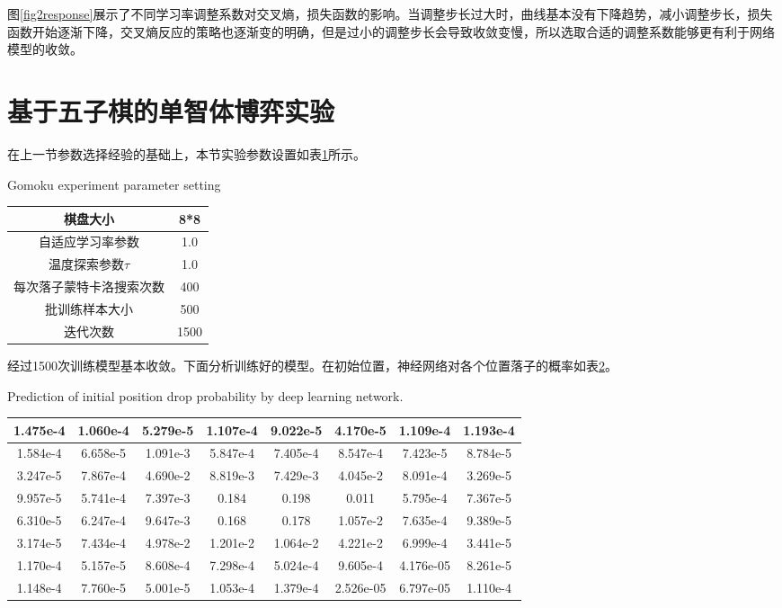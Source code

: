 图\ref{fig2response}展示了不同学习率调整系数对交叉熵，损失函数的影响。当调整步长过大时，曲线基本没有下降趋势，减小调整步长，损失函数开始逐渐下降，交叉熵反应的策略也逐渐变的明确，但是过小的调整步长会导致收敛变慢，所以选取合适的调整系数能够更有利于网络模型的收敛。
\section{基于五子棋的单智体博弈实验}

在上一节参数选择经验的基础上，本节实验参数设置如表\ref{canshu}所示。
\begin{table}[htbp]
	\centering
	{Gomoku experiment parameter setting}
	\label{canshu}
	\begin{tabular}{c|c}
		\hline 
		棋盘大小 & 8*8 \\ 
		\hline 
		自适应学习率参数 & 1.0 \\ 
		\hline 
		温度探索参数$\tau$& 1.0 \\ 
		\hline 
		每次落子蒙特卡洛搜索次数 & 400 \\ 
		\hline 
		批训练样本大小 & 500 \\ 
		\hline 
		迭代次数 & 1500 \\ 
		\hline 
	\end{tabular} 
\end{table}



经过1500次训练模型基本收敛。下面分析训练好的模型。在初始位置，神经网络对各个位置落子的概率如表\ref{tab:gailv}。
\begin{table}[htbp]
	\centering
	{Prediction of initial position drop probability by deep learning network.}
	\label{tab:gailv}
	\begin{tabular}{|c|c|c|c|c|c|c|c|}
		\hline 
		1.475e-4 & 1.060e-4 & 5.279e-5 & 1.107e-4 & 9.022e-5 & 4.170e-5 & 1.109e-4 & 1.193e-4 \\ 
		\hline 
		1.584e-4 & 6.658e-5 & 1.091e-3 & 5.847e-4 & 7.405e-4 & 8.547e-4 & 7.423e-5 & 8.784e-5 \\ 
		\hline 
		3.247e-5 & 7.867e-4& 4.690e-2 & 8.819e-3 & 7.429e-3&4.045e-2 & 8.091e-4 & 3.269e-5 \\ 
		\hline 
		9.957e-5& 5.741e-4 & 7.397e-3 & 0.184 & 0.198 & 0.011& 5.795e-4 & 7.367e-5 \\ 
		\hline 
		6.310e-5 &6.247e-4& 9.647e-3& 0.168 & 0.178 & 1.057e-2 & 7.635e-4 & 9.389e-5 \\ 
		\hline 
		3.174e-5 & 7.434e-4 & 4.978e-2 & 1.201e-2 & 1.064e-2 & 4.221e-2 & 6.999e-4 & 3.441e-5 \\ 
		\hline 
		1.170e-4 & 5.157e-5& 8.608e-4 & 7.298e-4 & 5.024e-4 & 9.605e-4 & 4.176e-05 & 8.261e-5\\ 
		\hline 
		1.148e-4 &7.760e-5 &  5.001e-5 & 1.053e-4 & 1.379e-4 & 2.526e-05 & 6.797e-05 & 1.110e-4 \\ 
		\hline 
	\end{tabular} 
\end{table}

